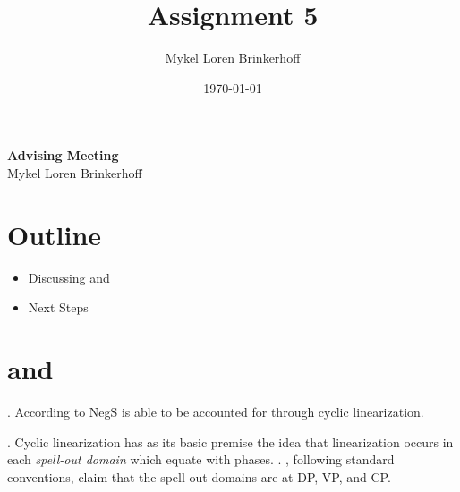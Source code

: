 \documentclass[12pt, letterpaper]{article}
\title{Assignment 5}
\author{Mykel Loren Brinkerhoff}
\date{\today}
\begin{document}
	
	\setlength{\Extopsep}{6pt}
	\setlength{\Exlabelsep}{9pt}		%
	
	
\begin{center}
	{\Large \textbf{Advising Meeting }}\\
	\vspace{6pt}
	Mykel Loren Brinkerhoff
\end{center}
\thispagestyle{fancy}

\section{Outline}

\begin{itemize}
	\item Discussing \citet{engelsScandinavianNegativeIndefinites2012} and \citet{foxCyclicLinearizationSyntactic2005}
	\item Next Steps
\end{itemize}

\section{\cite{engelsScandinavianNegativeIndefinites2012} and \cite{foxCyclicLinearizationSyntactic2005}}

\ex. According to \citet{engelsScandinavianNegativeIndefinites2012} NegS is able to be accounted for through  cyclic linearization. 

\ex. Cyclic linearization has as its basic premise the idea that linearization occurs in each \textit{spell-out domain} which \citet{foxCyclicLinearizationSyntactic2005} equate with phases.
\a. \citeauthor{foxCyclicLinearizationSyntactic2005}, following standard conventions, claim that the spell-out domains are at DP, VP, and CP.
\end{document}

